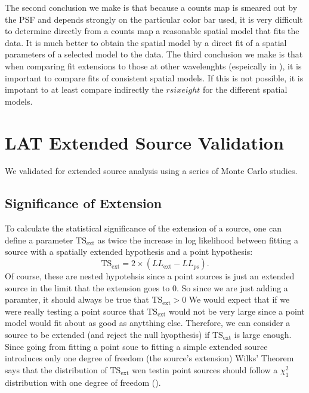 \documentclass[12pt,preprint]{aastex}
\newcommand{\tev}{\text{TeV}\xspace}
\newcommand{\tsext}{{\ensuremath{\text{TS}_\text{ext}}}\xspace}
\newcommand{\pointlike}{\text{\em pointlike}\xspace}
\begin{document}
The second conclusion we make is that because a counts map is smeared
out by the PSF and depends strongly on the particular color bar used, it
is very difficult to determine directly from a counts map a reasonable
spatial model that fits the data.  It is much better to obtain the
spatial model by a direct fit of a spatial parameters of a selected
model to the data.  The third conclusion we make is that when comparing
fit extensions to those at other wavelenghts (espeically in \tev), it is
important to compare fits of consistent spatial models. If this is not
possible, it is impotant to at least compare indirectly the $rsixeight$
for the different spatial models.


\section{LAT Extended Source Validation}

We validated \pointlike for extended source
analysis using a series of Monte Carlo studies.

\subsection{Significance of Extension}

To calculate the statistical significance of the extension of a source,
one can define a parameter $\tsext$ as twice the increase in log
likelihood between fitting a source with a spatially extended hypothesis
and a point hypothesis:
\begin{equation}
  \tsext=2\times(LL_\text{ext}-LL_\text{ps}).
\end{equation}
Of course, these are nested hypotehsis since a point sources is just an
extended source in the limit that the extension goes to 0. So since we
are just adding a paramter, it should always be true that $\tsext > 0$
We would expect that if we were really testing a point source that
\tsext would not be very large since a point model would fit about
as good as anytthing else. Therefore, we can consider a source to be
extended (and reject the null hyopthesis) if \tsext is large enough.
Since going from fitting a point soue to fitting a simple extended
source introduces only one degree of freedom (the source's extension)
Wilks' Theorem says that the distribution of $\tsext$ wen testin
point sources should follow a $\chi^2_1$ distribution with one degree
of freedom (\cite{wilks_theorem}).
\end{document}
